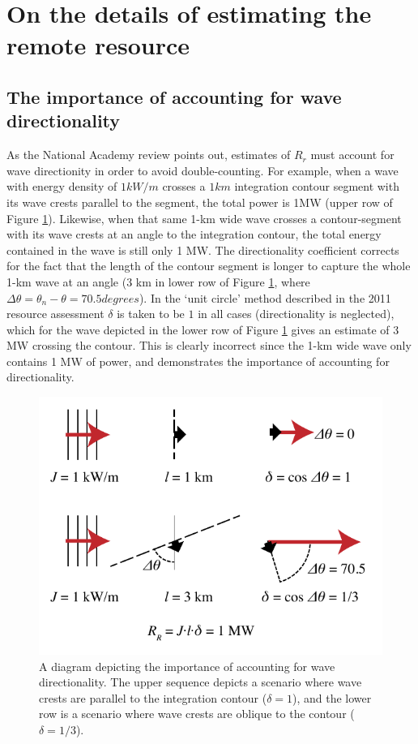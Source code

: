 \section{On the details of estimating the remote resource} \label{appendix:one-way-method}

\subsection{The importance of accounting for wave directionality}
\label{appendix:directionality}

As the National Academy review points out, estimates of $R_r$ must account for wave directionity in order to avoid double-counting. For example, when a wave with energy density of $1 \unit{kW/m}$ crosses a $1 \unit{km}$ integration contour segment with its wave crests parallel to the segment, the total power is 1MW (upper row of Figure \ref{fig:directionality}). Likewise, when that same 1-km wide wave crosses a contour-segment with its wave crests at an angle to the integration contour, the total energy contained in the wave is still only 1 MW. The directionality coefficient corrects for the fact that the length of the contour segment is longer to capture the whole 1-km wave at an angle (3 km in lower row of Figure \ref{fig:directionality}, where $\Delta\theta = \theta_n - \theta = 70.5 \unit{degrees}$). In the `unit circle' method described in the 2011 resource assessment $\delta$ is taken to be $1$ in all cases (directionality is neglected), which for the wave depicted in the lower row of Figure \ref{fig:directionality} gives an estimate of 3 MW crossing the contour. This is clearly incorrect since the 1-km wide wave only contains 1 MW of power, and demonstrates the importance of accounting for directionality.

\begin{figure}[ht]
    \centering
    \includegraphics[width=0.6 \linewidth]{../diagram/Dot-Product_Schematic}
    \caption{A diagram depicting the importance of accounting for wave directionality. The upper sequence depicts a scenario where wave crests are parallel to the integration contour ($\delta = 1$), and the lower row is a scenario where wave crests are oblique to the contour ($\delta = 1/3$).}
    \label{fig:directionality}
\end{figure}

